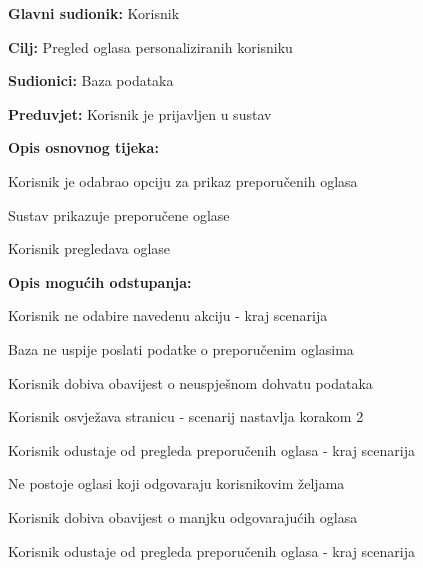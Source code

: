 					\noindent {}
					\begin{packed_item}
	
						\item \textbf{Glavni sudionik: }Korisnik
						\item  \textbf{Cilj:} Pregled oglasa personaliziranih korisniku
						\item  \textbf{Sudionici:} Baza podataka
						\item  \textbf{Preduvjet:} Korisnik je prijavljen u sustav
						
						
						\item  \textbf{Opis osnovnog tijeka:}
						
						\item[] \begin{packed_enum}
							\item Korisnik je odabrao opciju za prikaz preporučenih oglasa
							\item Sustav prikazuje preporučene oglase
							\item Korisnik pregledava oglase
						\end{packed_enum}

						\eject

						\item  \textbf{Opis mogućih odstupanja:}

						\item[] \begin{packed_item}
							\item[1.a] Korisnik ne odabire navedenu akciju - kraj scenarija
							\item[2.a] Baza ne uspije poslati podatke o preporučenim oglasima
							\item[] \begin{packed_enum}		
								\item Korisnik dobiva obavijest o neuspješnom dohvatu podataka
								\item
									\begin{packed_enum}
										\item Korisnik osvježava stranicu - scenarij nastavlja korakom 2
										\item Korisnik odustaje od pregleda preporučenih oglasa - kraj scenarija
									\end{packed_enum}							
							\end{packed_enum}	
							\item[2.b] Ne postoje oglasi koji odgovaraju korisnikovim željama
							\item[] \begin{packed_enum}		
								\item Korisnik dobiva obavijest o manjku odgovarajućih oglasa
								\item Korisnik odustaje od pregleda preporučenih oglasa - kraj scenarija							
							\end{packed_enum}	
						\end{packed_item}	
					\end{packed_item}

